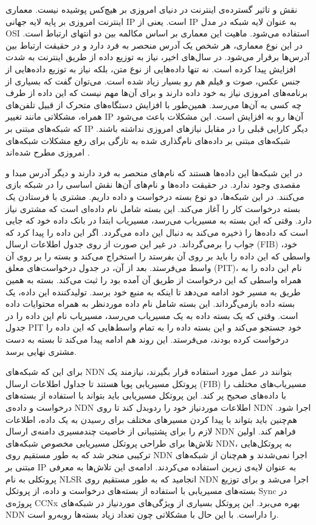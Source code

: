 

نقش و تاثیر گسترده‌ی اینترنت در دنیای امروزی بر هیچ‌کس پوشیده نیست. معماری اینترنت امروزی بر پایه لایه جهانی IP است. یعنی از IP به عنوان لایه شبکه در مدل OSI  استفاده می‌شود. ماهیت این معماری بر اساس مکالمه بین دو انتهای ارتباط است. در این نوع معماری، هر شخص یک آدرس منحصر به فرد دارد و در حقیقت ارتباط بین آدرس‌ها برقرار می‌شود. 
در سال‌های اخیر، نیاز به توزیع داده‌ از طریق اینترنت به شدت افزایش پیدا کرده است. نه تنها داده‌هایی از نوع متن، بلکه نیاز به توزیع داده‌هایی از جنس عکس، صوت و فیلم هم رو بسیار زیاد شده است. می‌توان گفت که بسیاری از برنامه‌های امروزی نیاز به خود داده دارند و برای آن‌ها مهم نیست که این داده از طرف چه کسی به آن‌ها می‌رسد. همین‌طور با افزایش دستگاه‌های متحرک از قبیل تلفن‌های همراه، مشکلاتی مانند تغییر IP آن‌ها رو به افزایش است. این مشکلات باعث می‌شود که شبکه‌‌های مبتنی بر IP دیگر کارایی قبلی را در مقابل نیازهای امروزی نداشته باشند. شبکه‌های مبتنی بر داده‌‌های نام‌گذاری شده به تازگی برای رفع مشکلات شبکه‌های امروزی مطرح شده‌اند
\cite{ndn}.

در این شبکه‌ها این داده‌ها هستند که نام‌های منحصر به فرد دارند و دیگر آدرس مبدا و مقصدی وجود ندارد. در حقیقت داده‌ها و نام‌‌های آن‌ها نقش اساسی را در شبکه بازی می‌کنند. در این شبکه‌ها، دو نوع بسته درخواست و داده داریم. مشتری با فرستادن یک بسته درخواست کار را آغاز می‌کند. این بسته شامل نام داده‌ای است که مشتری نیاز دارد. وقتی که این بسته به مسیریاب می‌رسد، مسیریاب ابتدا در بانک داده خود که جایی است که داده‌ها را ذخیره می‌کند به دنبال این داده می‌گردد. اگر این داده را پیدا کرد که جواب را برمی‌گرداند. در غیر این صورت از روی جدول اطلاعات ارسال (FIB) خود، واسطی که این داده را باید بر روی آن بفرستد را استخراج می‌کند و بسته را بر روی آن واسط می‌فرستد. بعد از آن، در جدول درخواست‌های معلق (PIT)، نام این داده را به همراه واسطی که این درخواست از طریق آن آمده بود را ثبت می‌کند. بسته به همین‌ طریق به مسیر خود ادامه می‌دهد تا اینکه به منبع خود برسد. تولیدکننده این داده، یک بسته داده بازمی‌گرداند. این بسته شامل نام داده موردنظر به همراه محتوایات داده است. وقتی که یک بسته داده به یک مسیریاب می‌رسد، مسیریاب نام این داده را در جدول PIT خود جستجو می‌کند و این بسته داده را به تمام واسط‌هایی که این داده را درخواست کرده بودند، می‌فرستد. این روند هم ادامه پیدا می‌کند تا بسته به دست مشتری نهایی برسد. 
 
برای این که شبکه‌های NDN بتوانند در عمل مورد استفاده قرار بگیرند، نیازمند یک پروتکل مسیریابی پویا هستند تا جداول اطلاعات ارسال (FIB) مسیریاب‌های مختلف را با داده‌های صحیح پر کند. این پروتکل مسیریابی باید بتواند با استفاده از بسته‌های درخواست و داده‌ی NDN اطلاعات موردنیاز خود را ردوبدل کند تا روی NDN اجرا شود. هم‌چنین باید بتواند با پیدا کردن مسیرهای مختلف برای رسیدن به یک داده، اطلاعات لازم را برای پشتیبانی از خاصیت چندمسیری دامنه‌ی ارسال NDN فراهم کند. اولین تلاش‌ها برای طراحی پروتکل مسیریابی مخصوص شبکه‌های NDN، به پروتکل‌هایی ترکیبی منجر شد که به طور مستقیم روی NDN اجرا نمی‌شدند و هم‌چنان از شبکه‌های مبتنی بر IP به عنوان لایه‌ی زیرین استفاده می‌کردند. ادامه‌ی این تلاش‌ها به معرفی پروتکلی به نام NLSR انجامید که به طور مستقیم روی NDN اجرا می‌شد و برای توزیع بسته‌های مسیریابی با استفاده از بسته‌های درخواست و داده، از پروتکل Sync در پروژه‌ی CCNx بهره می‌برد. این پروتکل بسیاری از ویژگی‌های موردنیاز در شبکه‌های NDN را داراست. با این حال با مشکلاتی چون تعداد زیاد بسته‌ها روبه‌رو است.

